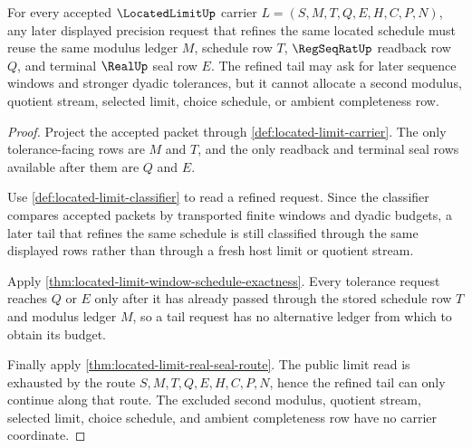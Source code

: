 \begin{theorem}
\label{thm:located-limit-schedule-tail-cofinality}
For every accepted $\LocatedLimitUp$ carrier $L=(S,M,T,Q,E,H,C,P,N)$, any later displayed precision request that refines the same located schedule must reuse the same modulus ledger $M$, schedule row $T$, $\RegSeqRatUp$ readback row $Q$, and terminal $\RealUp$ seal row $E$. The refined tail may ask for later sequence windows and stronger dyadic tolerances, but it cannot allocate a second modulus, quotient stream, selected limit, choice schedule, or ambient completeness row.
\end{theorem}
\begin{proof}
Project the accepted packet through \autoref{def:located-limit-carrier}. The only tolerance-facing rows are $M$ and $T$, and the only readback and terminal seal rows available after them are $Q$ and $E$.

Use \autoref{def:located-limit-classifier} to read a refined request. Since the classifier compares accepted packets by transported finite windows and dyadic budgets, a later tail that refines the same schedule is still classified through the same displayed rows rather than through a fresh host limit or quotient stream.

Apply \autoref{thm:located-limit-window-schedule-exactness}. Every tolerance request reaches $Q$ or $E$ only after it has already passed through the stored schedule row $T$ and modulus ledger $M$, so a tail request has no alternative ledger from which to obtain its budget.

Finally apply \autoref{thm:located-limit-real-seal-route}. The public limit read is exhausted by the route $S,M,T,Q,E,H,C,P,N$, hence the refined tail can only continue along that route. The excluded second modulus, quotient stream, selected limit, choice schedule, and ambient completeness row have no carrier coordinate.
\end{proof}

